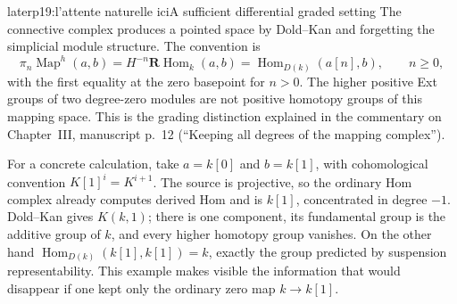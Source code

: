 \begin{dcomment}{later}{p19:l'attente naturelle ici}{A sufficient differential graded setting}
The connective complex produces a pointed space by Dold--Kan and forgetting the simplicial module structure. The convention is
\[
 \pi_n\operatorname{Map}^{h}(a,b)
   =H^{-n}\mathbf R\operatorname{Hom}_k(a,b)
   =\operatorname{Hom}_{D(k)}(a[n],b),\qquad n\geq0,
\]
with the first equality at the zero basepoint for $n>0$. The higher positive Ext groups of two degree-zero modules are not positive homotopy groups of this mapping space. This is the grading distinction explained in the commentary on Chapter~III, manuscript p.~12 (``Keeping all degrees of the mapping complex'').

For a concrete calculation, take $a=k[0]$ and $b=k[1]$, with cohomological convention $K[1]^i=K^{i+1}$. The source is projective, so the ordinary Hom complex already computes derived Hom and is $k[1]$, concentrated in degree $-1$. Dold--Kan gives $K(k,1)$; there is one component, its fundamental group is the additive group of $k$, and every higher homotopy group vanishes. On the other hand $\operatorname{Hom}_{D(k)}(k[1],k[1])=k$, exactly the group predicted by suspension representability. This example makes visible the information that would disappear if one kept only the ordinary zero map $k\to k[1]$.
\end{dcomment}

